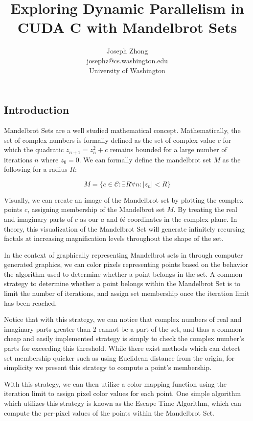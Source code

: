 \documentclass[letterpaper]{article}
\title{Exploring Dynamic Parallelism in CUDA C with Mandelbrot Sets}
\author{Joseph Zhong
\\ josephz@cs.washington.edu
\\ University of Washington}
\begin{document}
\maketitle
\begin{multicols}{2}

  \section{Introduction}

Mandelbrot Sets are a well studied mathematical concept. Mathematically, the set
  of complex numbers is formally defined as the set of complex value $c$ for 
  which the quadratic $z_{n+1} = z_n^2+c$ remains bounded for a large number of 
  iterations $n$ where $z_0 = 0$. We can formally define the mandelbrot set $M$
  as the following for a radius $R$:

  $$M = \{ c \in \mathcal{C} : \exists R \forall n : |z_n| < R  \}$$

Visually, we can create an image of the Mandelbrot set by plotting the complex
  points $c$, assigning membership of the Mandelbrot set $M$. By treating the
  real and imaginary parts of $c$ as our $a$ and $bi$ coordinates in the complex
  plane. In theory, this visualization of the Mandelbrot Set will generate
  infinitely recursing factals at increasing magnification levels throughout the
  shape of the set.

In the context of graphically representing Mandelbrot sets in through computer 
  generated graphics, we can color pixels representing points based on the
  behavior the algorithm used to determine whether a point belongs in the set. A
  common strategy to determine whether a point belongs within the Mandelbrot Set
  is to limit the number of iterations, and assign set membership once the 
  iteration limit has been reached.

Notice that with this strategy, we can notice that complex numbers of real and
  imaginary parts greater than 2 cannot be a part of the set, and thus a common
  cheap and easily implemented strategy is simply to check the complex number's
  parts for exceeding this threshold. While there exist methods which can detect
  set membership quicker such as using Euclidean distance from the origin, for
  simplicity we present this strategy to compute a point's membership.

With this strategy, we can then utilize a color mapping function using the
  iteration limit to assign pixel color values for each point. One simple
  algorithm which utilizes this strategy is known as the Escape Time Algorithm,
  which can compute the per-pixel values of the points within the Mandelbrot
  Set.
  

\end{multicols}
\end{document}
